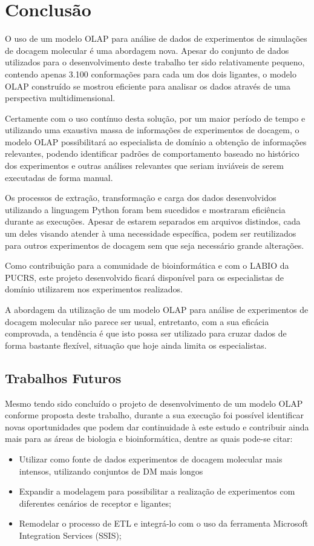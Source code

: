 \chapter{Conclusão}

O uso de um modelo OLAP para análise de dados de experimentos de simulações de docagem molecular é uma abordagem nova. Apesar do conjunto de dados utilizados para o desenvolvimento deste trabalho ter sido relativamente pequeno, contendo apenas 3.100 conformações para cada um dos dois ligantes, o modelo OLAP construído se mostrou eficiente para analisar os dados através de uma perspectiva multidimensional.

Certamente com o uso contínuo desta solução, por um maior período de tempo e utilizando uma exaustiva massa de informações de experimentos de docagem, o modelo OLAP possibilitará ao especialista de domínio a obtenção de informações relevantes, podendo identificar padrões de comportamento baseado no histórico dos experimentos e outras análises relevantes que seriam inviáveis de serem executadas de forma manual.

Os processos de extração, transformação e carga dos dados desenvolvidos utilizando a linguagem Python foram bem sucedidos e mostraram eficiência durante as execuções. Apesar de estarem separados em arquivos distindos, cada um deles visando atender à uma necessidade específica, podem ser reutilizados para outros experimentos de docagem sem que seja necessário grande alterações.

Como contribuição para a comunidade de bioinformática e com o LABIO da PUCRS, este projeto desenvolvido ficará disponível para os especialistas de domínio utilizarem nos experimentos realizados.

A abordagem da utilização de um modelo OLAP para análise de experimentos de docagem molecular não parece ser usual, entretanto, com a sua eficácia comprovada, a tendência é que isto possa ser utilizado para cruzar dados de forma bastante flexível, situação que hoje ainda limita os especialistas.

\section{Trabalhos Futuros}
	Mesmo tendo sido concluído o projeto de desenvolvimento de um modelo OLAP conforme proposta deste trabalho, durante a sua execução foi possível identificar novas oportunidades que podem dar continuidade à este estudo e contribuir ainda mais para as áreas de biologia e bioinformática, dentre as quais pode-se citar:

\begin{itemize}
 	\item Utilizar como fonte de dados experimentos de docagem molecular mais intensos, utilizando conjuntos de DM mais longos
 	\item Expandir a modelagem para possibilitar a realização de experimentos com diferentes cenários de receptor e ligantes;
 	\item Remodelar o processo de ETL e integrá-lo com o uso da ferramenta Microsoft Integration Services (SSIS);
\end{itemize}



